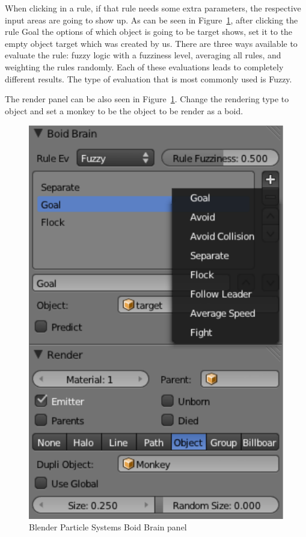 When clicking in a rule, if that rule needs some extra parameters, the respective input areas are going to show up. As can be seen in Figure~\ref{boidsBrain}, after clicking the rule Goal the options of which object is going to be target shows, set it to the empty object target which was created by us. There are three ways available to evaluate the rule: fuzzy logic with a fuzziness level, averaging all rules, and weighting the rules randomly. Each of these evaluations leads to completely different results. The type of evaluation that is most commonly used is Fuzzy.

The render panel can be also seen in Figure~\ref{boidsBrain}. Change the rendering type to object and set a monkey to be the object to be render as a boid.

\begin{figure}[htbp]
\begin{center}
\includegraphics[scale = 0.5]{figures/boidsBrain.pdf}
\caption{Blender Particle Systems Boid Brain panel}
\label{boidsBrain}
\end{center}
\end{figure}

